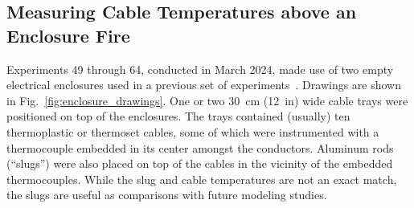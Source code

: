 \documentclass[12pt]{article}
\begin{document}
\subsection{Measuring Cable Temperatures above an Enclosure Fire}

Experiments 49 through 64, conducted in March 2024, made use of two empty electrical enclosures used in a previous set of experiments~\cite{OLIVE-FIRE}. Drawings are shown in Fig.~\ref{fig:enclosure_drawings}. One or two 30~cm (12~in) wide cable trays were positioned on top of the enclosures. The trays contained (usually) ten thermoplastic or thermoset cables, some of which were instrumented with a thermocouple embedded in its center amongst the conductors. Aluminum rods (``slugs'') were also placed on top of the cables in the vicinity of the embedded thermocouples. While the slug and cable temperatures are not an exact match, the slugs are useful as comparisons with future modeling studies.
\end{document}
